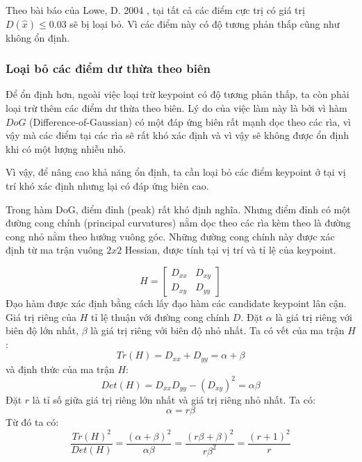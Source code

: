 \documentclass[conference]{IEEEtran}
\begin{document}
Theo bài báo của Lowe, D. 2004 \cite{baibao1}, tại tất cả các điểm cực trị có giá trị $D(\hat{x}) \leq  0.03$ sẽ bị loại bỏ. Vì các điểm này có độ tương phản thấp cũng như không ổn định. 
	\subsubsection{Loại bỏ các điểm dư thừa theo biên}
	
	Để ổn định hơn, ngoài việc loại trừ keypoint có độ tương phản thấp, ta còn phải loại trừ thêm các điểm dư thừa theo biên. Lý do của việc làm này là bởi vì hàm $DoG$ (Difference-of-Gaussian) có một đáp ứng biên rất mạnh dọc theo các rìa, vì vậy mà các điểm tại các rìa sẽ rất khó xác định và vì vậy sẽ không được ổn định khi có một lượng nhiễu nhỏ.

Vì vậy, để nâng cao khả năng ổn định, ta cần loại bỏ các điểm keypoint ở tại vị trí khó xác định nhưng lại có đáp ứng biên cao.

Trong hàm DoG, điểm đỉnh (peak) rất khó định nghĩa. Nhưng điểm đỉnh có một đường cong chính (principal curvatures) nằm dọc theo các rìa kèm theo là đường cong nhỏ nằm theo hướng vuông góc. Những đường cong chính này được xác định từ ma trận vuông $2x2$ Hessian, được tính tại vị trí và tỉ lệ của keypoint.

\begin{equation}
	H = \begin{bmatrix}
	D_{xx} 	& D_{xy} \\
	D_{xy} 	& D_{yy} 
	\end{bmatrix}
\end{equation}
Đạo hàm được xác định bằng cách lấy đạo hàm các candidate keypoint lân cận. Giá trị riêng của $H$ tỉ lệ thuận với đường cong chính $D$. Đặt $\alpha$ là giá trị riêng với biên độ lớn nhất, $\beta$ là giá trị riêng với biên độ nhỏ nhất. Ta có vết của ma trận $H$:
\begin{equation}
Tr(H) = D_{xx} + D_{yy} = \alpha + \beta
\end{equation}
và định thức của ma trận $H$:
\begin{equation}
Det(H) = D_{xx} D_{yy} - (D_{xy})^2 = \alpha \beta
\end{equation}
Đặt $r$ là tỉ số giữa giá trị riêng lớn nhất và giá trị riêng nhỏ nhất. Ta có:
\begin{equation}
 \alpha =r\beta
\end{equation}
Từ đó ta có:
\begin{equation}
 \frac{Tr(H)^2}{Det(H)} = \frac{(\alpha + \beta)^2}{\alpha \beta} = \frac{(r\beta + \beta)^2}{r\beta^2} = \frac{(r+1)^2}{r}
\end{equation}
\end{document}
